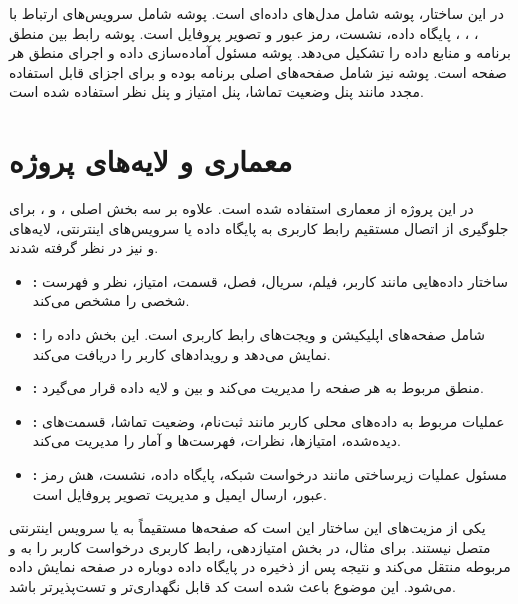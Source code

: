 \documentclass[a4paper,14pt]{extarticle}
\begin{document}
در این ساختار، پوشه  شامل مدل‌های داده‌ای است. پوشه  شامل سرویس‌های ارتباط با ، ، ، پایگاه داده، نشست، رمز عبور و تصویر پروفایل است. پوشه  رابط بین منطق برنامه و منابع داده را تشکیل می‌دهد. پوشه  مسئول آماده‌سازی داده و اجرای منطق هر صفحه است. پوشه  نیز شامل صفحه‌های اصلی برنامه بوده و  برای اجزای قابل استفاده مجدد مانند پنل وضعیت تماشا، پنل امتیاز و پنل نظر استفاده شده است.

\section*{معماری  و لایه‌های پروژه}

در این پروژه از معماری  استفاده شده است. علاوه بر سه بخش اصلی ،  و ، برای جلوگیری از اتصال مستقیم رابط کاربری به پایگاه داده یا سرویس‌های اینترنتی، لایه‌های  و  نیز در نظر گرفته شدند.

\begin{itemize}
    \item \textbf{:} ساختار داده‌هایی مانند کاربر، فیلم، سریال، فصل، قسمت، امتیاز، نظر و فهرست شخصی را مشخص می‌کند.

    \item \textbf{:} شامل صفحه‌های اپلیکیشن و ویجت‌های رابط کاربری است. این بخش داده را نمایش می‌دهد و رویدادهای کاربر را دریافت می‌کند.

    \item \textbf{:} منطق مربوط به هر صفحه را مدیریت می‌کند و بین  و لایه داده قرار می‌گیرد.

    \item \textbf{:} عملیات مربوط به داده‌های محلی کاربر مانند ثبت‌نام، وضعیت تماشا، قسمت‌های دیده‌شده، امتیازها، نظرات، فهرست‌ها و آمار را مدیریت می‌کند.

    \item \textbf{:} مسئول عملیات زیرساختی مانند درخواست شبکه، پایگاه داده، نشست، هش رمز عبور، ارسال ایمیل و مدیریت تصویر پروفایل است.
\end{itemize}

یکی از مزیت‌های این ساختار این است که صفحه‌ها مستقیماً به  یا سرویس اینترنتی متصل نیستند. برای مثال، در بخش امتیازدهی، رابط کاربری درخواست کاربر را به  و  مربوطه منتقل می‌کند و نتیجه پس از ذخیره در پایگاه داده دوباره در صفحه نمایش داده می‌شود. این موضوع باعث شده است کد قابل نگهداری‌تر و تست‌پذیرتر باشد.
\end{document}
